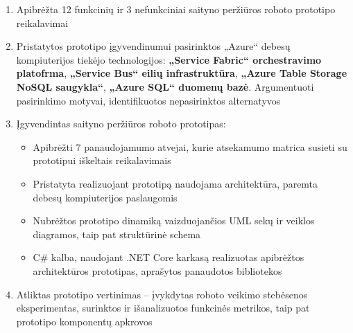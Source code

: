 \begin{enumerate}
    
    \item Apibrėžta 12 funkcinių ir 3 nefunkciniai saityno peržiūros roboto prototipo reikalavimai
    
    
    \item Pristatytos prototipo įgyvendinumui pasirinktos „Azure“ debesų kompiuterijos tiekėjo technologijos: \textbf{„Service Fabric“ orchestravimo platofrma}, \textbf{„Service Bus“ eilių infrastruktūra}, \textbf{„Azure Table Storage NoSQL saugykla“}, \textbf{„Azure SQL“ duomenų bazė}. Argumentuoti pasirinkimo motyvai, identifikuotos nepasirinktos alternatyvos
    
    \item Įgyvendintas saityno peržiūros roboto prototipas:
    \begin{itemize}
        \item Apibrėžti 7 panaudojamumo atvejai, kurie atsekamumo matrica susieti su prototipui iškeltais reikalavimais
        \item Pristatyta realizuojant prototipą naudojama architektūra, paremta debesų kompiuterijos paslaugomis
        \item Nubrėžtos prototipo dinamiką vaizduojančios UML sekų ir veiklos diagramos, taip pat struktūrinė schema
        \item C\# kalba, naudojant .NET Core karkasą realizuotas apibrėžtos architektūros prototipas, aprašytos panaudotos bibliotekos
    \end{itemize}
    
    
    \item Atliktas prototipo vertinimas -- įvykdytas roboto veikimo stebėsenos eksperimentas, surinktos ir išanalizuotos funkcinės metrikos, taip pat prototipo komponentų apkrovos
\end{enumerate}